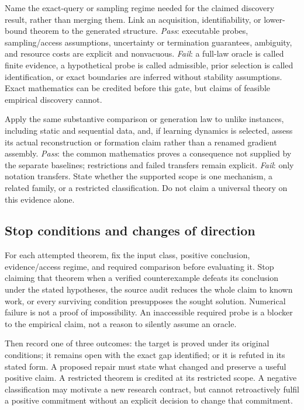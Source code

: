 \documentclass[11pt]{article}
\theoremstyle{remark}
\begin{document}
\begin{description}[style=nextline,leftmargin=0pt]
\item[Gate E \quad Establish the claimed empirical warrant]
Name the exact-query or sampling regime needed for the claimed discovery result, rather than merging them. Link an acquisition, identifiability, or lower-bound theorem to the generated structure. \emph{Pass}: executable probes, sampling/access assumptions, uncertainty or termination guarantees, ambiguity, and resource costs are explicit and nonvacuous. \emph{Fail}: a full-law oracle is called finite evidence, a hypothetical probe is called admissible, prior selection is called identification, or exact boundaries are inferred without stability assumptions. Exact mathematics can be credited before this gate, but claims of feasible empirical discovery cannot.

\item[Gate F \quad Test transfer and assess the thesis]
Apply the same substantive comparison or generation law to unlike instances, including static and sequential data, and, if learning dynamics is selected, assess its actual reconstruction or formation claim rather than a renamed gradient assembly. \emph{Pass}: the common mathematics proves a consequence not supplied by the separate baselines; restrictions and failed transfers remain explicit. \emph{Fail}: only notation transfers. State whether the supported scope is one mechanism, a related family, or a restricted classification. Do not claim a universal theory on this evidence alone.
\end{description}

\subsection{Stop conditions and changes of direction}

For each attempted theorem, fix the input class, positive conclusion, evidence/access regime, and required comparison before evaluating it. Stop claiming that theorem when a verified counterexample defeats its conclusion under the stated hypotheses, the source audit reduces the whole claim to known work, or every surviving condition presupposes the sought solution. Numerical failure is not a proof of impossibility. An inaccessible required probe is a blocker to the empirical claim, not a reason to silently assume an oracle.

Then record one of three outcomes: the target is proved under its original conditions; it remains open with the exact gap identified; or it is refuted in its stated form. A proposed repair must state what changed and preserve a useful positive claim. A restricted theorem is credited at its restricted scope. A negative classification may motivate a new research contract, but cannot retroactively fulfil a positive commitment without an explicit decision to change that commitment.
\end{document}
